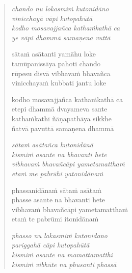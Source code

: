 \clearpage
\begin{verse}

\emph{chando nu lokasmiṁ kutonidāno\\
vinicchayā vāpi kutopahūtā}\\
\emph{kodho mosavajjañca kathaṁkathā ca\\
ye vāpi dhammā samaṇena vuttā}

sātaṁ asātanti yamāhu loke\\
tamūpanissāya pahoti chando\\
rūpesu disvā vibhavaṁ bhavañca\\
vinicchayaṁ kubbati jantu loke

kodho mosavajjañca kathaṁkathā ca\\
etepi dhammā dvayameva sante\\
kathaṁkathī ñāṇapathāya sikkhe\\
ñatvā pavuttā samaṇena dhammā

\emph{sātaṁ asātañca kutonidānā\\
kismiṁ asante na bhavanti hete}\\
\emph{vibhavaṁ bhavañcāpi yametamatthaṁ\\
etaṁ me pabrūhi yatonidānaṁ}

phassanidānaṁ sātaṁ asātaṁ\\
phasse asante na bhavanti hete\\
vibhavaṁ bhavañcāpi yametamatthaṁ\\
etaṁ te pabrūmi itonidānaṁ

\emph{phasso nu lokasmiṁ kutonidāno\\
pariggahā cāpi kutopahūtā}\\
\emph{kismiṁ asante na mamattamatthi\\
kismiṁ vibhūte na phusanti phassā}

\end{verse}


